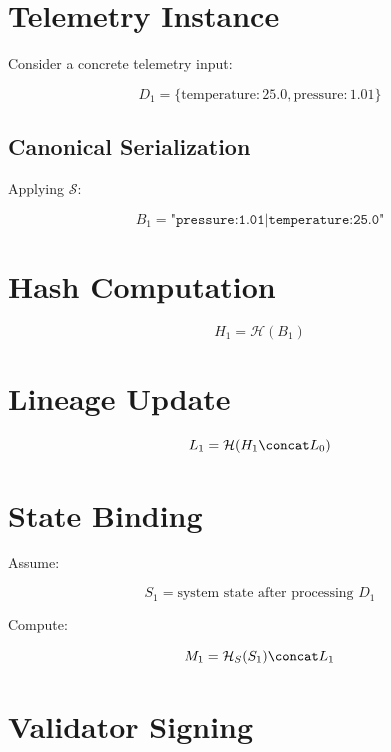 \section{Telemetry Instance}

Consider a concrete telemetry input:

\begin{equation}
D_1 = \{\text{temperature}: 25.0, \text{pressure}: 1.01\}
\end{equation}

\subsection{Canonical Serialization}

Applying $\mathcal{S}$:

\begin{equation}
B_1 = \texttt{"pressure:1.01|temperature:25.0"}
\end{equation}

\section{Hash Computation}

\begin{equation}
H_1 = \mathcal{H}(B_1)
\end{equation}

\section{Lineage Update}

\begin{equation}
L_1 = \mathcal{H}(H_1 \concat L_0)
\end{equation}

\section{State Binding}

Assume:

\begin{equation}
S_1 = \text{system state after processing } D_1
\end{equation}

Compute:

\begin{equation}
M_1 = \mathcal{H}_S(S_1) \concat L_1
\end{equation}

\section{Validator Signing}

